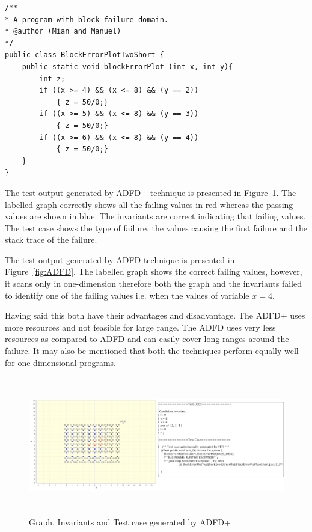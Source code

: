 \documentclass[runningheads,a4paper]{llncs}
\begin{document}
\begin{lstlisting}
/** 
* A program with block failure-domain.
* @author (Mian and Manuel)
*/
public class BlockErrorPlotTwoShort {
	public static void blockErrorPlot (int x, int y){
		int z;
		if ((x >= 4) && (x <= 8) && (y == 2))
			{ z = 50/0;}
		if ((x >= 5) && (x <= 8) && (y == 3))
			{ z = 50/0;}
		if ((x >= 6) && (x <= 8) && (y == 4))
			{ z = 50/0;}
	}
}
\end{lstlisting}

The test output generated by ADFD+ technique is presented in Figure~\ref{fig:ADFD+}. The labelled graph correctly shows all the failing values in red whereas the passing values are shown in blue. The invariants are correct indicating that failing values. The test case shows the type of failure, the values causing the first failure and the stack trace of the failure.

The test output generated by ADFD technique is presented in Figure~\ref{fig:ADFD}. The labelled graph shows the correct failing values, however, it scans only in one-dimension therefore both the graph and the invariants failed to identify one of the failing values i.e. when the values of variable $x = 4$. 

Having said this both have their advantages and disadvantage. The ADFD+ uses more resources and not feasible for large range. The ADFD uses very less resources as compared to ADFD and can easily cover long ranges around the failure. It may also be mentioned that both the techniques perform equally well for one-dimensional programs.


\begin{figure}[H]
\centering
\includegraphics[width= 12.5cm,height=6cm]{adfdPlusCombined.png}
\caption{Graph, Invariants and Test case generated by ADFD+}
\label{fig:ADFD+}
\end{figure}
\end{document}
